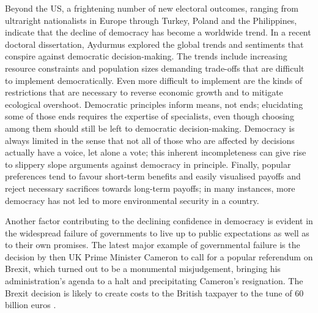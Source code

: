 \documentclass[10pt,a4paper]{article}
\begin{document}
\begin{multicols}{2}
Beyond the US, a frightening number of new electoral outcomes, ranging from ultraright nationalists in Europe through Turkey, Poland and the Philippines, indicate that the decline of democracy has become a worldwide trend. In a recent doctoral dissertation, Aydurmus \citep{r05} explored the global trends and sentiments that conspire against democratic decision-making. The trends include increasing resource constraints and population sizes demanding trade-offs that are difficult to implement democratically. Even more difficult to implement are the kinds of restrictions that are necessary to reverse economic growth and to mitigate ecological overshoot. Democratic principles inform means, not ends; elucidating some of those ends requires the expertise of specialists, even though choosing among them should still be left to democratic decision-making. Democracy is always limited in the sense that not all of those who are affected by decisions actually have a voice, let alone a vote; this inherent incompleteness can give rise to slippery slope arguments against democracy in principle. Finally, popular preferences tend to favour short-term benefits and easily visualised payoffs and reject necessary sacrifices towards long-term payoffs; in many instances, more democracy has not led to more environmental security in a country. 

Another factor contributing to the declining confidence in democracy is evident in the widespread failure of governments to live up to public expectations as well as to their own promises. The latest major example of governmental failure is the decision by then UK Prime Minister Cameron to call for a popular referendum on Brexit, which turned out to be a monumental misjudgement, bringing his administration's agenda to a halt and precipitating Cameron's resignation. The Brexit decision is likely to create costs to the British taxpayer to the tune of 60 billion euros \citep{r02}.



\end{multicols}
\end{document}
